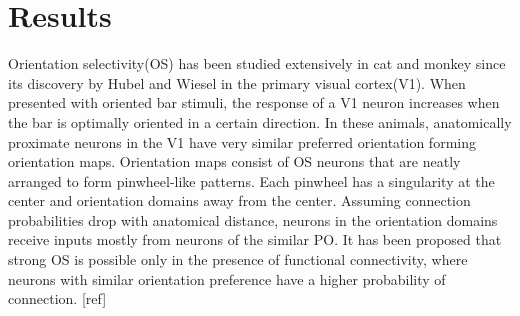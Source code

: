 \section{Results}
Orientation selectivity(OS) has been studied extensively in cat and monkey since its discovery by Hubel and Wiesel in the primary visual cortex(V1). When presented with oriented bar stimuli, the response of a V1 neuron increases when the bar is optimally oriented in a certain direction. In these animals, anatomically proximate neurons in the V1 have very similar preferred orientation forming orientation maps. Orientation maps consist of OS neurons that are neatly arranged to form pinwheel-like patterns. Each pinwheel has a singularity at the center and orientation domains away from the center. Assuming connection probabilities drop with anatomical distance, neurons in the orientation domains receive inputs mostly from neurons of the similar PO. It has been proposed that strong OS is possible only in the presence of functional connectivity,  where neurons with similar orientation preference have a higher probability of connection. [ref]\\
